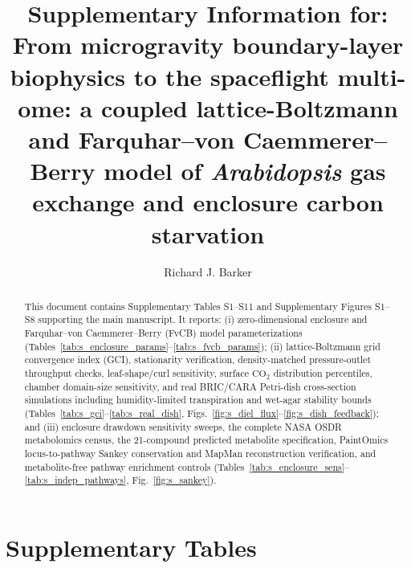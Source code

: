 \documentclass[preprint,11pt,numbers,sort&compress]{elsarticle}
\begin{document}
\sloppy

\begin{frontmatter}

\title{Supplementary Information for: From microgravity boundary-layer biophysics to the spaceflight multi-ome: a coupled lattice-Boltzmann and Farquhar--von Caemmerer--Berry model of \textit{Arabidopsis} gas exchange and enclosure carbon starvation}

\author[purdue]{Richard J. Barker}


\begin{abstract}
This document contains Supplementary Tables S1--S11 and Supplementary Figures S1--S8 supporting the main manuscript. It reports: (i) zero-dimensional enclosure and Farquhar--von Caemmerer--Berry (FvCB) model parameterizations (Tables~\ref{tab:s_enclosure_params}--\ref{tab:s_fvcb_params}); (ii) lattice-Boltzmann grid convergence index (GCI), stationarity verification, density-matched pressure-outlet throughput checks, leaf-shape/curl sensitivity, surface $\mathrm{CO_2}$ distribution percentiles, chamber domain-size sensitivity, and real BRIC/CARA Petri-dish cross-section simulations including humidity-limited transpiration and wet-agar stability bounds (Tables~\ref{tab:s_gci}--\ref{tab:s_real_dish}, Figs.~\ref{fig:s_diel_flux}--\ref{fig:s_dish_feedback}); and (iii) enclosure drawdown sensitivity sweeps, the complete NASA OSDR metabolomics census, the 21-compound predicted metabolite specification, PaintOmics locus-to-pathway Sankey conservation and MapMan reconstruction verification, and metabolite-free pathway enrichment controls (Tables~\ref{tab:s_enclosure_sens}--\ref{tab:s_indep_pathways}, Fig.~\ref{fig:s_sankey}).
\end{abstract}

\end{frontmatter}

\section*{Supplementary Tables}
\end{document}
